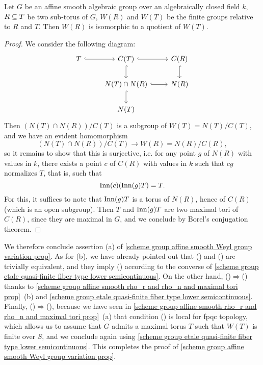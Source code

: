 \begin{lemma}\label{scheme alg group affine Weyl group of inclusion torus prop}
Let $G$ be an affine smooth algebraic group over an algebraically closed field $k$, $R\subseteq T$ be two sub-torus of $G$, $W(R)$ and $W(T)$ be the finite groups relative to $R$ and $T$. Then $W(R)$ is isomorphic to a quotient of $W(T)$.
\end{lemma}
\begin{proof}
We consider the following diagram:
\[\begin{tikzcd}
T\ar[r,hook]&C(T)\ar[r,hook]\ar[d,hook]&C(R)\ar[d,hook]\\
&N(T)\cap N(R)\ar[d,hook]\ar[r,hook]&N(R)\\
&N(T)
\end{tikzcd}\]
Then $(N(T)\cap N(R))/C(T)$ is a subgroup of $W(T)=N(T)/C(T)$, and we have an evident homomorphism
\[(N(T)\cap N(R))/C(T)\to W(R)=N(R)/C(R),\]
so it remains to show that this is surjective, i.e. for any point $g$ of $N(R)$ with values in $k$, there exists a point $c$ of $C(R)$ with values in $k$ such that $cg$ normalizes $T$, that is, such that
\[\mathrm{Inn}(c)(\mathrm{Inn}(g)T)=T.\]
For this, it suffices to note that $\mathrm{Inn}(g)T$ is a torus of $N(R)$, hence of $C(R)$ (which is an open subgroup). Then $T$ and $\mathrm{Inn}(g)T$ are two maximal tori of $C(R)$, since they are maximal in $G$, and we conclude by Borel's conjugation theorem.
\end{proof}

We therefore conclude assertion (a) of \cref{scheme group affine smooth Weyl group variation prop}. As for (b), we have already pointed out that () and () are trivially equivalent, and they imply () according to the converse of \cref{scheme group etale quasi-finite fiber type lower semicontinuous}. On the other hand, ()$\Rightarrow$() thanks to \cref{scheme group affine smooth rho_r and rho_n and maximal tori prop}~(b) and \cref{scheme group etale quasi-finite fiber type lower semicontinuous}. Finally, ()$\Rightarrow$(), because we have seen in \cref{scheme group affine smooth rho_r and rho_n and maximal tori prop}~(a) that condition () is local for fpqc topology, which allows us to assume that $G$ admits a maximal torus $T$ such that $W(T)$ is finite over $S$, and we conclude again using \cref{scheme group etale quasi-finite fiber type lower semicontinuous}. This completes the proof of \cref{scheme group affine smooth Weyl group variation prop}.

